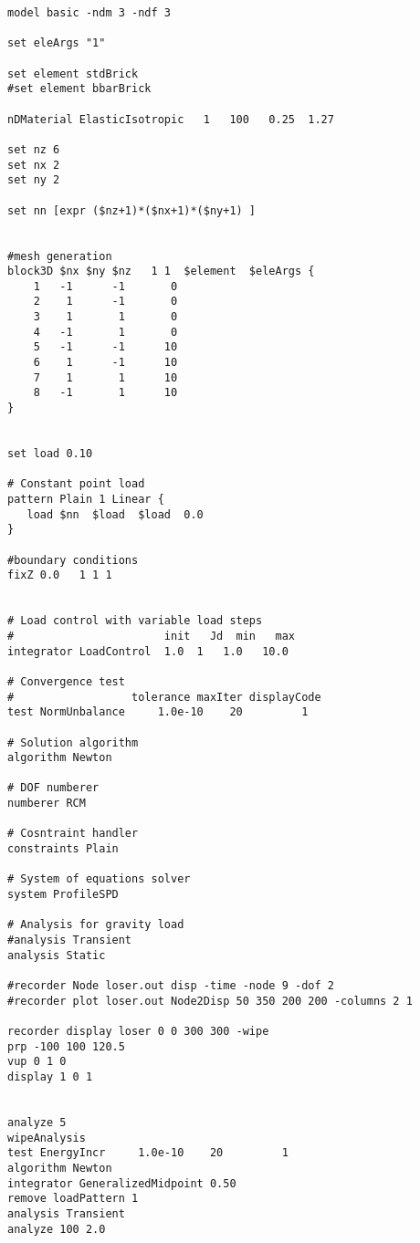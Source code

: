 \documentclass[12pt]{article}
\begin{document}
\vspace{0.2in} 
{\sf\small
\begin{verbatim}
model basic -ndm 3 -ndf 3

set eleArgs "1" 

set element stdBrick
#set element bbarBrick

nDMaterial ElasticIsotropic   1   100   0.25  1.27

set nz 6
set nx 2 
set ny 2

set nn [expr ($nz+1)*($nx+1)*($ny+1) ]


#mesh generation
block3D $nx $ny $nz   1 1  $element  $eleArgs {
    1   -1      -1       0
    2    1      -1       0
    3    1       1       0
    4   -1       1       0 
    5   -1      -1      10
    6    1      -1      10
    7    1       1      10
    8   -1       1      10
}


set load 0.10

# Constant point load
pattern Plain 1 Linear {
   load $nn  $load  $load  0.0
}

#boundary conditions
fixZ 0.0   1 1 1 


# Load control with variable load steps
#                       init   Jd  min   max
integrator LoadControl  1.0  1   1.0   10.0

# Convergence test
#                  tolerance maxIter displayCode
test NormUnbalance     1.0e-10    20         1

# Solution algorithm
algorithm Newton

# DOF numberer
numberer RCM

# Cosntraint handler
constraints Plain 

# System of equations solver
system ProfileSPD

# Analysis for gravity load
#analysis Transient 
analysis Static 

#recorder Node loser.out disp -time -node 9 -dof 2
#recorder plot loser.out Node2Disp 50 350 200 200 -columns 2 1

recorder display loser 0 0 300 300 -wipe
prp -100 100 120.5
vup 0 1 0 
display 1 0 1 


analyze 5
wipeAnalysis
test EnergyIncr     1.0e-10    20         1
algorithm Newton
integrator GeneralizedMidpoint 0.50
remove loadPattern 1
analysis Transient
analyze 100 2.0


\end{verbatim}
}
\end{document}
